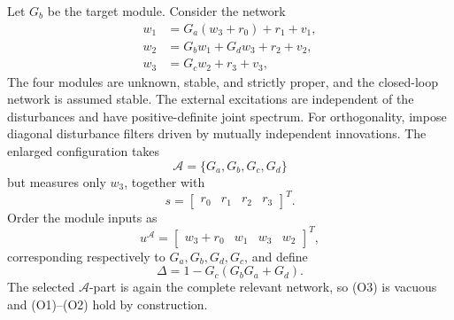 \documentclass[11pt,a4paper]{article}
\newcommand{\Aset}{\mathcal A}
\begin{document}
Let $G_b$ be the target module.  Consider the network
\begin{align}
  w_1 &= G_a(w_3+r_0)+r_1+v_1,
  \label{eq:constructed-w1}\\
  w_2 &= G_b w_1+G_d w_3+r_2+v_2,
  \label{eq:constructed-w2}\\
  w_3 &= G_c w_2+r_3+v_3,
  \label{eq:constructed-w3}
\end{align}
The four modules are unknown, stable, and strictly proper, and the closed-loop network is assumed stable.  The external excitations are independent of the disturbances and have positive-definite joint spectrum.  For orthogonality, impose diagonal disturbance filters driven by mutually independent innovations.  The enlarged configuration takes
\[
  \Aset=\{G_a,G_b,G_c,G_d\}
\]
but measures only $w_3$, together with
\[
  s=\begin{bmatrix}r_0&r_1&r_2&r_3\end{bmatrix}^{\!T}.
\]
Order the module inputs as
\[
  u^{\Aset}
  =\begin{bmatrix}w_3+r_0&w_1&w_3&w_2\end{bmatrix}^{\!T},
\]
corresponding respectively to $G_a,G_b,G_d,G_c$, and define
\begin{equation}
  \Delta=1-G_c(G_bG_a+G_d).
  \label{eq:constructed-delta}
\end{equation}
The selected $\Aset$-part is again the complete relevant network, so (O3) is vacuous and (O1)--(O2) hold by construction.
\end{document}
